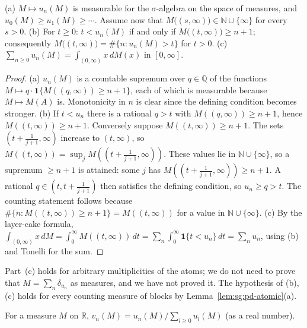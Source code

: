 \begin{lemma}\label{lem:sg:pd-atoms}
  \leanok
(a) $M\mapsto u_n(M)$ is measurable for the $\sigma$-algebra on the space of measures, and $u_0(M)\ge u_1(M)\ge\cdots$. Assume now that $M\big((s,\infty)\big)\in\mathbb N\cup\{\infty\}$ for every $s>0$. (b) For $t\ge0$: $t<u_n(M)$ if and only if $M\big((t,\infty)\big)\ge n+1$; consequently $M\big((t,\infty)\big)=\#\{n:u_n(M)>t\}$ for $t>0$. (c) $\sum_{n\ge0}u_n(M)=\int_{(0,\infty)}x\,dM(x)$ in $[0,\infty]$.
\end{lemma}

\begin{proof}
  \leanok
(a) $u_n(M)$ is a countable supremum over $q\in\mathbb Q$ of the functions $M\mapsto q\cdot\mathbf 1\{M((q,\infty))\ge n+1\}$, each of which is measurable because $M\mapsto M(A)$ is. Monotonicity in $n$ is clear since the defining condition becomes stronger. (b) If $t<u_n$ there is a rational $q>t$ with $M((q,\infty))\ge n+1$, hence $M((t,\infty))\ge n+1$. Conversely suppose $M((t,\infty))\ge n+1$. The sets $(t+\tfrac1{j+1},\infty)$ increase to $(t,\infty)$, so $M((t,\infty))=\sup_jM((t+\tfrac1{j+1},\infty))$. These values lie in $\mathbb N\cup\{\infty\}$, so a supremum $\ge n+1$ is attained: some $j$ has $M((t+\tfrac1{j+1},\infty))\ge n+1$. A rational $q\in(t,t+\tfrac1{j+1})$ then satisfies the defining condition, so $u_n\ge q>t$. The counting statement follows because $\#\{n:M((t,\infty))\ge n+1\}=M((t,\infty))$ for a value in $\mathbb N\cup\{\infty\}$. (c) By the layer-cake formula, $\int_{(0,\infty)}x\,dM=\int_0^\infty M((t,\infty))\,dt=\sum_n\int_0^\infty\mathbf 1\{t<u_n\}\,dt=\sum_nu_n$, using (b) and Tonelli for the sum.
\end{proof}

Part~(c) holds for arbitrary multiplicities of the atoms; we do not need to prove that $M=\sum_n\delta_{u_n}$ as measures, and we have not proved it. The hypothesis of (b), (c) holds for every counting measure of blocks by Lemma~\ref{lem:sg:pd-atomic}(a).

\begin{definition}\label{def:sg:pd-weights}
  \leanok
For a measure $M$ on $\mathbb R$, $v_n(M)=u_n(M)\big/\sum_{l\ge0}u_l(M)$ (as a real number).
\end{definition}

